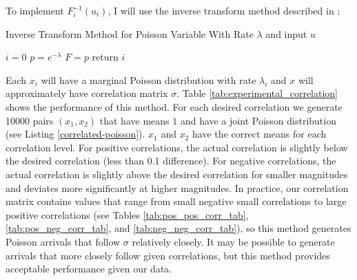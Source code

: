 To implement $F^{-1}_i(u_i)$, I will use the inverse transform method described in \cite{B1}:
\newline

\begin{algorithm}[H]
\SetAlgoLined
\caption{Inverse Transform Method for Poisson Variable With Rate $\lambda$ and input $u$}
 $i = 0$\;
 $p = e^{-\lambda}$\;
 $F = p$\;
 return $i$ \;
\end{algorithm}

Each $x_i$ will have a marginal Poisson distribution with rate $\lambda_i$ and $x$ will approximately have correlation matrix $\sigma$. Table \ref{tab:experimental_correlation} shows the performance of this method. For each desired correlation we generate 10000 pairs $(x_1,x_2)$ that have means $1$ and have a joint Poisson distribution (see Listing \ref{correlated-poisson}). $x_1$ and $x_2$ have the correct means for each correlation level. For positive correlations, the actual correlation is slightly below the desired correlation (less than 0.1 difference). For negative correlations, the actual correlation is slightly above the desired correlation for smaller magnitudes and deviates more significantly at higher magnitudes. In practice, our correlation matrix contains values that range from small negative small correlations to large positive correlations (see Tables \ref{tab:pos_pos_corr_tab}, \ref{tab:pos_neg_corr_tab}, and \ref{tab:neg_neg_corr_tab}), so this method generates Poisson arrivals that follow $\sigma$ relatively closely. It may be possible to generate arrivals that more closely follow given correlations, but this method provides acceptable performance given our data.

